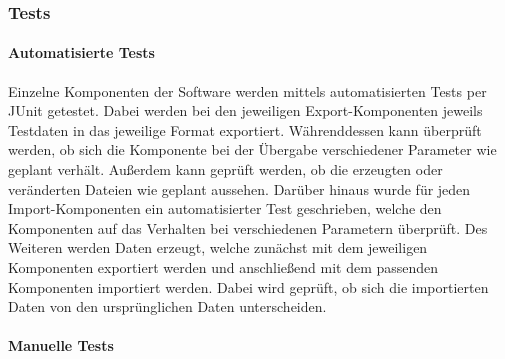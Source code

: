\subsubsection{Tests}
\paragraph{Automatisierte Tests}
Einzelne Komponenten der Software werden mittels automatisierten Tests per JUnit getestet. Dabei werden bei den jeweiligen Export-Komponenten jeweils Testdaten in das jeweilige Format exportiert. Währenddessen kann überprüft werden, ob sich die Komponente bei der Übergabe verschiedener Parameter wie geplant verhält. Außerdem kann geprüft werden, ob die erzeugten oder veränderten Dateien wie geplant aussehen. Darüber hinaus wurde für jeden Import-Komponenten ein automatisierter Test geschrieben, welche den Komponenten auf das Verhalten bei verschiedenen Parametern überprüft. Des Weiteren werden Daten erzeugt, welche zunächst mit dem jeweiligen Komponenten exportiert werden und anschließend mit dem passenden Komponenten importiert werden. Dabei wird geprüft, ob sich die importierten Daten von den ursprünglichen Daten unterscheiden.

\paragraph{Manuelle Tests}
